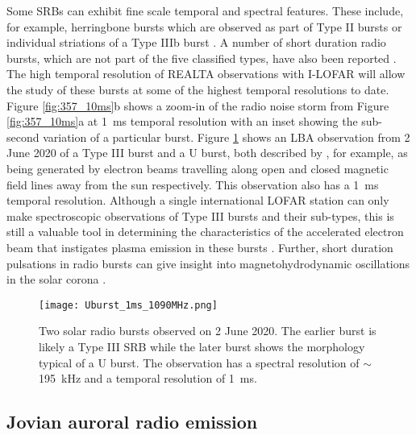 Some SRBs can exhibit fine scale temporal and spectral features. These include, for example, herringbone bursts which are observed as part of Type II bursts \citep[for example,][]{Carley2015} or individual striations of a Type IIIb burst \citep[for example,][]{Zhang2020}. 
A number of short duration radio bursts, which are not part of the five classified types, have also been reported \citep[for example,][]{Ellis1967, Ellis1969, Melnik2010}. 
The high temporal resolution of REALTA observations with I-LOFAR will allow the study of these bursts at some of the highest temporal resolutions to date. Figure \ref{fig:357_10ms}b shows a zoom-in of the radio noise storm from Figure \ref{fig:357_10ms}a at 1~ms temporal resolution with an inset showing the sub-second variation of a particular burst. Figure \ref{fig:uburst} shows an LBA observation from 2 June 2020 of a Type III burst and a U burst, both described by \cite{Reid2014}, for example, as being generated by electron beams travelling along open and closed magnetic field lines away from the sun respectively. This observation also has a 1~ms temporal resolution. Although a single international LOFAR station can only make spectroscopic observations of Type III bursts and their sub-types, this is still a valuable tool in determining the characteristics of the accelerated electron beam that instigates plasma emission in these bursts \citep{Reid2018}. Further, short duration pulsations in radio bursts can give insight into magnetohydrodynamic oscillations in the solar corona \citep{Carley2019}.

\begin{figure}[ht]
    \centering
    \texttt{[image: Uburst\_1ms\_1090MHz.png]}
    \caption[Two solar radio bursts observed on 2 June 2020.]{Two solar radio bursts observed on 2 June 2020. The earlier burst is likely a Type III SRB while the later burst shows the morphology typical of a U burst. The observation has a spectral resolution of $\sim$ \SI{195}{\kilo \hertz} and a temporal resolution of \SI{1}{\milli \second}.}
    \label{fig:uburst}
\end{figure}

\subsection{Jovian auroral radio emission}

